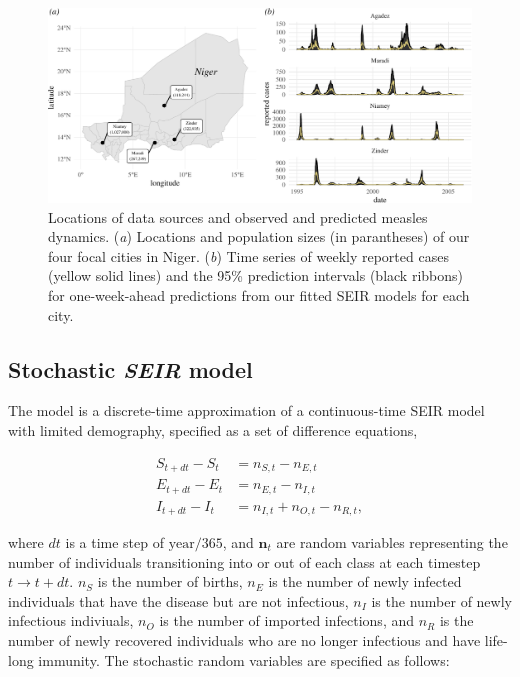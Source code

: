 \documentclass[3p]{elsarticle} %
\makeatletter
\def\maxwidth{\ifdim\Gin@nat@width>\linewidth\linewidth
\else\Gin@nat@width\fi}
\let\Oldincludegraphics\includegraphics
\renewcommand{\includegraphics}[1]{\Oldincludegraphics[width=\maxwidth]{#1}}
\makeatother
\begin{document}
\begin{figure}
\centering
\includegraphics{measles-ews-manuscript_files/figure-latex/data-plot-1.pdf}
\caption{Locations of data sources and observed and predicted measles
dynamics. (\emph{a}) Locations and population sizes (in parantheses) of
our four focal cities in Niger. (\emph{b}) Time series of weekly
reported cases (yellow solid lines) and the 95\% prediction intervals
(black ribbons) for one-week-ahead predictions from our fitted SEIR
models for each city. \label{data-plot}}
\end{figure}

\hypertarget{stochastic-seir-model}{%
\subsection{\texorpdfstring{Stochastic \emph{SEIR}
model}{Stochastic SEIR model}}\label{stochastic-seir-model}}

The model is a discrete-time approximation of a continuous-time SEIR
model with limited demography, specified as a set of difference
equations,

\begin{align}
S_{t+dt} - S_t &= n_{S,t} - n_{E,t} \\
E_{t+dt} - E_t &= n_{E,t} - n_{I,t} \\
I_{t+dt} - I_t &= n_{I,t} + n_{O,t} - n_{R,t},
\end{align}

\noindent{}where \(dt\) is a time step of \(\text{year} / 365\), and
\(\textbf{n}_t\) are random variables representing the number of
individuals transitioning into or out of each class at each timestep
\(t \rightarrow t+dt\). \(n_{S}\) is the number of births, \(n_{E}\) is
the number of newly infected individuals that have the disease but are
not infectious, \(n_{I}\) is the number of newly infectious indiviuals,
\(n_{O}\) is the number of imported infections, and \(n_{R}\) is the
number of newly recovered individuals who are no longer infectious and
have life-long immunity. The stochastic random variables are specified
as follows:
\end{document}

